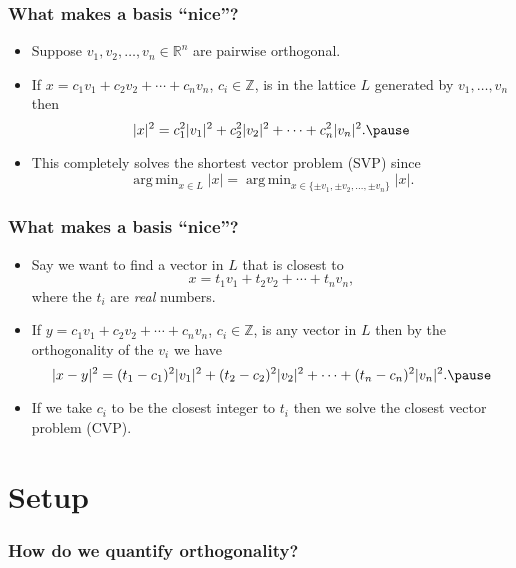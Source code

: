 \documentclass{beamer}
\newcommand{\integers}{\mathbb{Z}}
\newcommand{\reals}{\mathbb{R}}
\DeclareMathOperator*{\argmin}{arg\,min}
\begin{document}
\begin{frame}
	\frametitle{What makes a basis ``nice''?}
	\begin{itemize}
		\item Suppose $v_1, v_2, \ldots, v_n\in \reals^n$ are pairwise orthogonal.\pause
		\item If $x = c_1v_1+c_2v_2 + \cdots + c_nv_n$, $c_i\in \integers$, is in the lattice $L$ generated by $v_1, \ldots, v_n$ then
		\[
		|x|^2 = c_1^2|v_1|^2 + c_2^2|v_2|^2 + \cdots + c_n^2|v_n|^2.\pause
		\]
		\item This completely solves the shortest vector problem (SVP) since
		\[
		\argmin_{x\in L}|x| = \argmin_{x\in \{\pm v_1, \pm v_2, \ldots, \pm v_n\}}|x|.
		\]
	\end{itemize}
\end{frame}

\begin{frame}
	\frametitle{What makes a basis ``nice''?}
	\begin{itemize}
		\item Say we want to find a vector in $L$ that is closest to
		\[
		x = t_1v_1 + t_2v_2 + \cdots + t_nv_n,
		\]
		where the $t_i$ are \textit{real} numbers.\pause
		\item If $y = c_1v_1+c_2v_2 + \cdots + c_nv_n$, $c_i\in \integers$, is any vector in $L$ then by the orthogonality of the $v_i$ we have
		\[
		|x-y|^2 = (t_1-c_1)^2|v_1|^2 + (t_2-c_2)^2|v_2|^2 + \cdots + (t_n-c_n)^2|v_n|^2.\pause
		\]
		\item If we take $c_i$ to be the closest integer to $t_i$ then we solve the closest vector problem (CVP).
	\end{itemize}
\end{frame}

\section{Setup}
\begin{frame}
	\frametitle{How do we quantify orthogonality?}
	
\end{frame}
\end{document}
